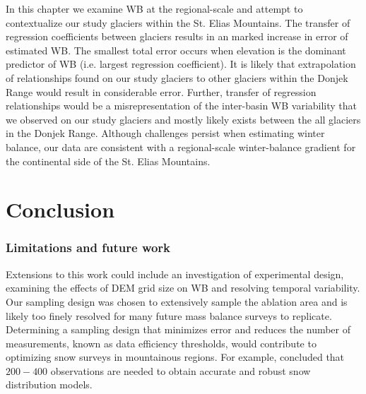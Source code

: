 \documentclass{sfuthesis}
\begin{document}
In this chapter we examine WB at the regional-scale and attempt to contextualize our study glaciers within the St. Elias Mountains. The transfer of regression coefficients between glaciers results in an marked increase in error of estimated WB. The smallest total error occurs when elevation is the dominant predictor of WB (i.e. largest regression coefficient). It is likely that extrapolation of relationships found on our study glaciers to other glaciers within the Donjek Range would result in considerable error. Further, transfer of regression relationships would be a misrepresentation of the inter-basin WB variability that we observed on our study glaciers and mostly likely exists between the all glaciers in the Donjek Range. Although challenges persist when estimating winter balance, our data are consistent with a regional-scale winter-balance gradient for the continental side of the St. Elias Mountains. 


\chapter{Conclusion}

\subsection{Limitations and future work}

Extensions to this work could include an investigation of experimental design, examining the effects of DEM grid size on WB and resolving temporal variability. Our sampling design was chosen to extensively sample the ablation area and is likely too finely resolved for many future mass balance surveys to replicate. Determining a sampling design that minimizes error and reduces the number of measurements, known as data efficiency thresholds, would contribute to optimizing snow surveys in mountainous regions. For example, \cite{Lopez2010} concluded that $200-400$ observations are needed to obtain accurate and robust snow distribution models. 
\end{document}
